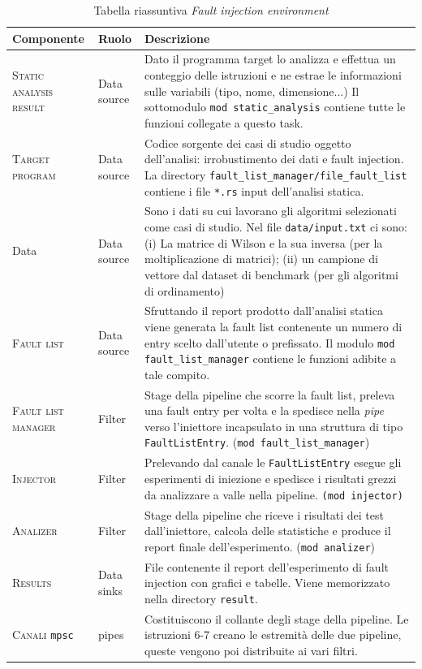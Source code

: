 \begin{table}[h] 
    \centering
    \small
    \begin{tabular}{p{4cm} p{2.5cm} p{8.5cm}}
        \toprule[1.5px]
        \textbf{\large Componente}&\textbf{\large Ruolo}&\textbf{\large Descrizione}\\
        \midrule[1.5px]
        \textsc{Static analysis result}&Data source&Dato il programma target lo analizza e  effettua un conteggio delle istruzioni e ne estrae le informazioni sulle variabili (tipo, nome, dimensione...) Il sottomodulo \texttt{mod static\_analysis} contiene tutte le funzioni collegate a questo task.\\
        \hline
        \textsc{Target program}&Data source&
            Codice sorgente dei casi di studio oggetto dell'analisi: irrobustimento dei dati e fault injection. La directory \texttt{fault\_list\_manager/file\_fault\_list} contiene i file \texttt{*.rs} input dell'analisi statica.\\
            \hline
            Data&Data source&Sono i dati su cui lavorano gli algoritmi selezionati come casi di studio. Nel file \texttt{data/input.txt} ci sono: (i) La matrice di Wilson e la sua inversa (per la moltiplicazione di matrici); (ii) un campione di vettore dal dataset di benchmark \cite{benchmark} (per gli algoritmi di ordinamento)\\
            \hline
        \textsc{Fault list}&Data source& Sfruttando il report prodotto dall'analisi statica viene generata la fault list contenente un numero di entry scelto dall'utente o prefissato. Il modulo \texttt{mod fault\_list\_manager} contiene le funzioni adibite a tale compito.\\
        \midrule
        \textsc{Fault list manager}&Filter&Stage della pipeline che scorre la fault list, preleva una fault entry per volta e la spedisce nella \textit{pipe} verso l'iniettore incapsulato in una struttura di tipo \texttt{FaultListEntry}. (\texttt{mod fault\_list\_manager})\\\hline
        \textsc{Injector}&Filter&Prelevando dal canale le \texttt{FaultListEntry} esegue gli esperimenti di iniezione e spedisce i risultati grezzi da analizzare a valle nella pipeline. \texttt{(mod injector)}\\\hline
        \textsc{Analizer}&Filter&Stage della pipeline che riceve i risultati dei test dall'iniettore, calcola delle statistiche e produce il report finale dell'esperimento. (\texttt{mod analizer})\\\hline
        \textsc{Results}&Data sinks&File contenente il report dell'esperimento di fault injection con grafici e tabelle. Viene memorizzato nella directory \texttt{result}.\\
        \midrule
        \textsc{Canali} \texttt{mpsc}&pipes&Costituiscono il collante degli stage della pipeline. Le istruzioni 6-7 creano le estremità delle due pipeline, queste vengono poi distribuite ai vari filtri.\\
        \bottomrule[1.5px]
   \end{tabular}
    \caption{Tabella riassuntiva \textit{Fault injection environment}}
    \label{setup}
\end{table}